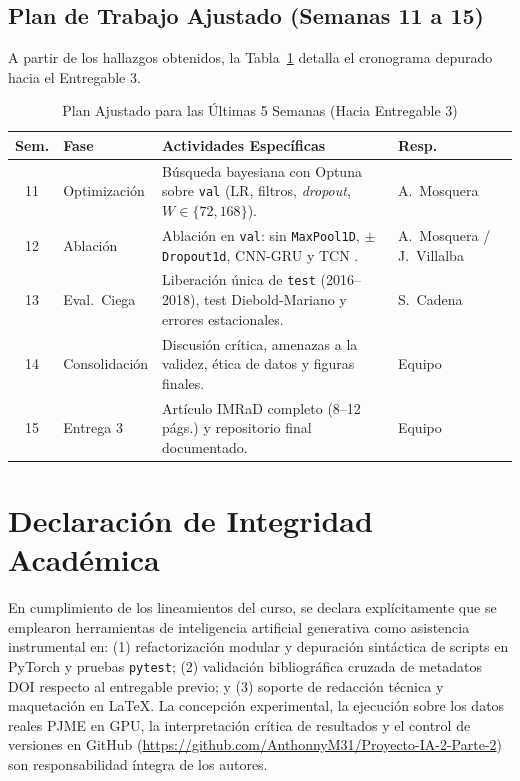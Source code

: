 \documentclass[conference]{IEEEtran}
\begin{document}
\subsection{Plan de Trabajo Ajustado (Semanas 11 a 15)}
A partir de los hallazgos obtenidos, la Tabla~\ref{tab:plan_ajustado} detalla el cronograma depurado hacia el Entregable 3.

\begin{table}[htbp]
\centering
\caption{Plan Ajustado para las Últimas 5 Semanas (Hacia Entregable 3)}
\label{tab:plan_ajustado}
\scriptsize
\setlength{\tabcolsep}{3pt}
\begin{tabularx}{\columnwidth}{c >{\raggedright\arraybackslash}p{1.35cm} >{\raggedright\arraybackslash}X >{\raggedright\arraybackslash}p{1.3cm}}
\toprule
\textbf{Sem.} & \textbf{Fase} & \textbf{Actividades Específicas} & \textbf{Resp.} \\
\midrule
11 & Optimización & Búsqueda bayesiana con Optuna \cite{akiba2019optuna} sobre \texttt{val} (LR, filtros, \textit{dropout}, $W \in \{72, 168\}$). & A.\ Mosquera \\
12 & Ablación & Ablación en \texttt{val}: sin \texttt{MaxPool1D}, $\pm$\texttt{Dropout1d}, CNN-GRU \cite{sajjad2020novel} y TCN \cite{bai2018empirical}. & A.\ Mosquera / J.\ Villalba \\
13 & Eval.\ Ciega & Liberación única de \texttt{test} (2016--2018), test Diebold-Mariano \cite{diebold1995comparing} y errores estacionales. & S.\ Cadena \\
14 & Consolidación & Discusión crítica, amenazas a la validez, ética de datos y figuras finales. & Equipo \\
15 & Entrega 3 & Artículo IMRaD completo (8--12 págs.) y repositorio final documentado. & Equipo \\
\bottomrule
\end{tabularx}
\end{table}

\section{Declaración de Integridad Académica}
En cumplimiento de los lineamientos del curso, se declara explícitamente que se emplearon herramientas de inteligencia artificial generativa como asistencia instrumental en: (1) refactorización modular y depuración sintáctica de scripts en PyTorch y pruebas \texttt{pytest}; (2) validación bibliográfica cruzada de metadatos DOI respecto al entregable previo; y (3) soporte de redacción técnica y maquetación en \LaTeX. La concepción experimental, la ejecución sobre los datos reales PJME en GPU, la interpretación crítica de resultados y el control de versiones en GitHub (\url{https://github.com/AnthonnyM31/Proyecto-IA-2-Parte-2}) son responsabilidad íntegra de los autores.



\end{document}
